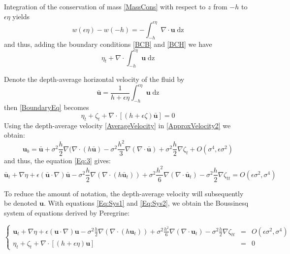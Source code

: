 \documentclass[11pt,a4paper]{article}
\begin{document}
Integration of the conservation of mass \eqref{MassCons} with respect to $z$ from $-h$ to $\epsilon\eta$ yields
\begin{equation}
w(\epsilon\eta) - w(-h) = - \int^{\epsilon\eta}_{-h} \! \nabla \cdot \mathbf{u} \; \mathrm{dz}
\end{equation}
and thus, adding the boundary conditions \eqref{BCB} and \eqref{BCH} we have
\begin{equation}
\eta_t + \nabla \cdot \int^{\epsilon\eta}_{-h}\!\mathbf{u} \; \mathrm{dz} \label{BoundaryEq}
\end{equation}

Denote the depth-average horizontal velocity of the fluid by 
\begin{equation}
\bar{\mathbf{u}} = \frac{1}{h+\epsilon \eta} \int^{\epsilon\eta}_{-h}\! \mathbf{u} \; \mathrm{dz} \label{AverageVelocity}
\end{equation}
then \eqref{BoundaryEq} becomes 
\begin{equation}
\eta_t + \zeta_t + \nabla \cdot [(h + \epsilon \zeta) \bar{\mathbf{u}}] = 0 \label{Eq:Sys2}
\end{equation}
Using the depth-average velocity \eqref{AverageVelocity} in \eqref{ApproxVelocity2} we obtain: 
\begin{equation}
\mathbf{u}_b = \bar{\mathbf{u}} + \sigma^2\frac{h}{2} \nabla (\nabla \cdot (h \bar{\mathbf{u}}) - \sigma^2 \frac{h^2}{3} \nabla (\nabla \cdot \bar{\mathbf{u}}) + \sigma^2 \frac{h}{2} \nabla \zeta_t + O(\sigma^4, \epsilon \sigma^2) 
\end{equation}
and thus, the equation \eqref{Eq:3} gives: 
\begin{equation}
\bar{\mathbf{u}}_t + \nabla \eta + \epsilon(\bar{\mathbf{u}} \cdot \nabla) \bar{\mathbf{u}} - \sigma^2 \frac{h}{2} \nabla ( \nabla \cdot (h\bar{\mathbf{u}}_t)) + \sigma^2 \frac{h^2}{6}\nabla ( \nabla \cdot \bar{\mathbf{u}}_t) - \sigma^2\frac{h}{2}\nabla \zeta_{tt} = O(\epsilon \sigma^2, \sigma^4) \label{Eq:Sys1}
\end{equation}

To reduce the amount of notation, the depth-average velocity will subsequently be denoted $\mathbf{u}$. With equations \eqref{Eq:Sys1} and \eqref{Eq:Sys2}, we obtain the Boussinesq system of equations derived by Peregrine:
\begin{center}
$\left\lbrace
\begin{array}{rll}
\displaystyle \mathbf{u}_t + \nabla \eta + \epsilon (\mathbf{u} \cdot \nabla)\mathbf{u} - \sigma^2\frac{h}{2}\nabla (\nabla \cdot (h \mathbf{u}_t)) + \sigma^2 \frac{h^2}{6}\nabla (\nabla \cdot \mathbf{u}_t) - \sigma^2\frac{h}{2}\nabla \zeta_{tt}  & = & \displaystyle O(\epsilon \sigma^2, \sigma^4) \\
\displaystyle \eta_t+\zeta_t + \nabla \cdot [(h+\epsilon\eta)\mathbf{u}] & = & 0
\end{array} \right.$
\end{center}
\end{document}
